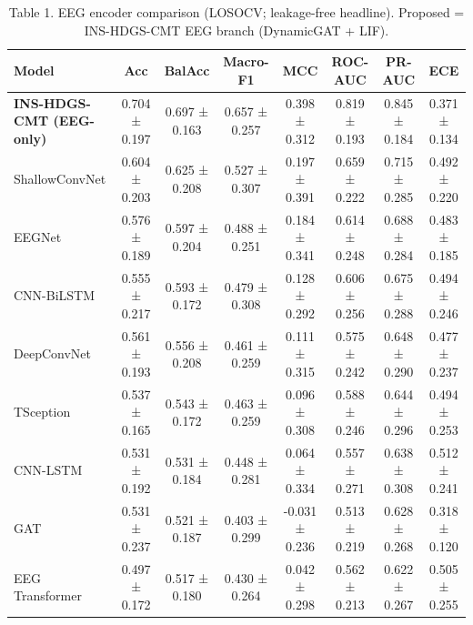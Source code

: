 \begin{table}[t]
\centering
\caption{Table 1. EEG encoder comparison (LOSOCV; leakage-free headline). Proposed = INS-HDGS-CMT EEG branch (DynamicGAT + LIF).}
\label{tab:table1_eeg_encoders}
\begin{tabular}{lccccccc}
\hline
Model & Acc & BalAcc & Macro-F1 & MCC & ROC-AUC & PR-AUC & ECE \\
\hline
\textbf{INS-HDGS-CMT (EEG-only)} & 0.704 ± 0.197 & 0.697 ± 0.163 & 0.657 ± 0.257 & 0.398 ± 0.312 & 0.819 ± 0.193 & 0.845 ± 0.184 & 0.371 ± 0.134 \\
ShallowConvNet & 0.604 ± 0.203 & 0.625 ± 0.208 & 0.527 ± 0.307 & 0.197 ± 0.391 & 0.659 ± 0.222 & 0.715 ± 0.285 & 0.492 ± 0.220 \\
EEGNet & 0.576 ± 0.189 & 0.597 ± 0.204 & 0.488 ± 0.251 & 0.184 ± 0.341 & 0.614 ± 0.248 & 0.688 ± 0.284 & 0.483 ± 0.185 \\
CNN-BiLSTM & 0.555 ± 0.217 & 0.593 ± 0.172 & 0.479 ± 0.308 & 0.128 ± 0.292 & 0.606 ± 0.256 & 0.675 ± 0.288 & 0.494 ± 0.246 \\
DeepConvNet & 0.561 ± 0.193 & 0.556 ± 0.208 & 0.461 ± 0.259 & 0.111 ± 0.315 & 0.575 ± 0.242 & 0.648 ± 0.290 & 0.477 ± 0.237 \\
TSception & 0.537 ± 0.165 & 0.543 ± 0.172 & 0.463 ± 0.259 & 0.096 ± 0.308 & 0.588 ± 0.246 & 0.644 ± 0.296 & 0.494 ± 0.253 \\
CNN-LSTM & 0.531 ± 0.192 & 0.531 ± 0.184 & 0.448 ± 0.281 & 0.064 ± 0.334 & 0.557 ± 0.271 & 0.638 ± 0.308 & 0.512 ± 0.241 \\
GAT & 0.531 ± 0.237 & 0.521 ± 0.187 & 0.403 ± 0.299 & -0.031 ± 0.236 & 0.513 ± 0.219 & 0.628 ± 0.268 & 0.318 ± 0.120 \\
EEG Transformer & 0.497 ± 0.172 & 0.517 ± 0.180 & 0.430 ± 0.264 & 0.042 ± 0.298 & 0.562 ± 0.213 & 0.622 ± 0.267 & 0.505 ± 0.255 \\
\hline
\end{tabular}
\end{table}
